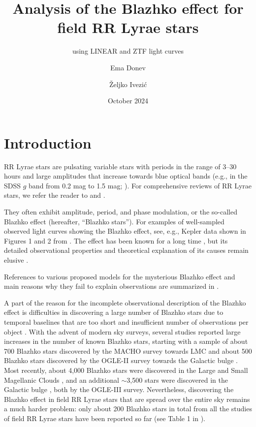 \documentclass{aa}
\title{Analysis of the Blazhko effect for field RR Lyrae stars}
\subtitle{using LINEAR and ZTF light curves}
\author{Ema Donev\inst{\ref{inst1}}
\and \v{Z}eljko Ivezi\'{c}\inst{\ref{inst2}}}
\institute{XV. Gymnasium (MIOC), Zagreb, Croatia, \email{emadonev@icloud.com}\label{inst1}
\and Department of Astronomy, University of Washington, Box 351580, Seattle, WA 98195, USA, \email{ivezic@uw.edu}\label{inst2}}
\date{October 2024}
\begin{document}
\maketitle

\section{Introduction\label{sec:intro}}

RR Lyrae stars are pulsating variable stars with periods in the range of 3--30 hours and large amplitudes
that increase towards blue optical bands (e.g., in the SDSS $g$ band from 0.2 mag to 1.5 mag;
\citealt{2010ApJ...708..717S}). For comprehensive reviews of RR Lyrae stars, we refer the reader to \cite{1995CAS....27.....S} and \cite{2009Ap&SS.320..261C}.

They often exhibit amplitude, period, and phase modulation, or the so-called Blazhko effect (hereafter,
``Blazhko stars''). For examples of well-sampled observed light curves showing the Blazhko effect, see,  e.g., Kepler
data shown in Figures 1 and 2 from \cite{2010MNRAS.409.1585B}. The effect has been known for a long time \citep{1907AN....175..325B}, but its detailed observational
properties and theoretical explanation of its causes remain elusive \cite{2009AIPC.1170..261K}.

References to various proposed models for the mysterious Blazhko effect and main
reasons why they fail to explain observations are summarized in \cite{2016CoKon.105...61K}. 

A part of the reason for the incomplete observational description of the Blazhko effect is difficulties in discovering a large number 
of Blazhko stars due to temporal baselines that are too short and insufficient number of observations per object
\citep{2016CoKon.105...61K,2022ApJS..258....4H}. With the advent of modern sky surveys, several studies
reported large increases in the number of known Blazhko stars, starting with a sample of about 700 Blazhko
stars discovered by the MACHO survey towards LMC \citep{2003ApJ...598..597A} and about 500 Blazhko stars
discovered by the OGLE-II survey towards the Galactic bulge \citep{2003AcA....53..307M}. 
Most recently,  about 4,000 Blazhko stars were discovered in the Large and Small Magellanic Clouds
\citep{2009AcA....59....1S, 2010AcA....60..165S}, and an additional $\sim$3,500 stars were discovered in the
Galactic bulge \citep{2011AcA....61....1S}, both by the OGLE-III survey. Nevertheless, discovering the Blazhko
effect in field RR Lyrae stars that are spread over the entire sky remains a much harder problem: only about
200 Blazhko stars in total from all the studies of field RR Lyrae stars have been reported so far (see Table 1
in \citealt{2016CoKon.105...61K}). 
\end{document}
